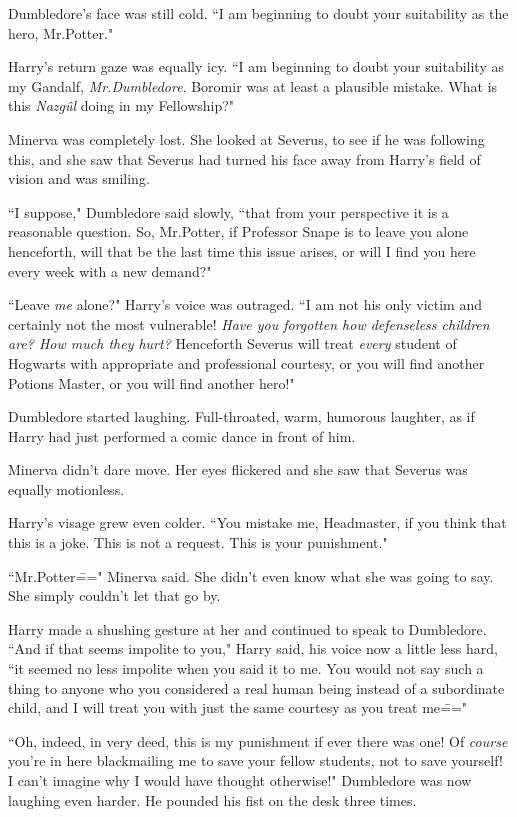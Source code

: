 Dumbledore's face was still cold. ``I am beginning to doubt your suitability as the hero, Mr.\?Potter."

Harry's return gaze was equally icy. ``I am beginning to doubt your suitability as my Gandalf, \emph{Mr.\?Dumbledore}. Boromir was at least a plausible mistake. What is this \emph{Nazgûl} doing in my Fellowship?"

Minerva was completely lost. She looked at Severus, to see if he was following this, and she saw that Severus had turned his face away from Harry's field of vision and was smiling.

``I suppose," Dumbledore said slowly, ``that from your perspective it is a reasonable question. So, Mr.\?Potter, if Professor Snape is to leave you alone henceforth, will that be the last time this issue arises, or will I find you here every week with a new demand?"

``Leave \emph{me} alone?" Harry's voice was outraged. ``I am not his only victim and certainly not the most vulnerable! \emph{Have you forgotten how defenseless children are? How much they hurt?} Henceforth Severus will treat \emph{every} student of Hogwarts with appropriate and professional courtesy, or you will find another Potions Master, or you will find another hero!"

Dumbledore started laughing. Full-throated, warm, humorous laughter, as if Harry had just performed a comic dance in front of him.

Minerva didn't dare move. Her eyes flickered and she saw that Severus was equally motionless.

Harry's visage grew even colder. ``You mistake me, Headmaster, if you think that this is a joke. This is not a request. This is your punishment."

``Mr.\?Potter\===" Minerva said. She didn't even know what she was going to say. She simply couldn't let that go by.

Harry made a shushing gesture at her and continued to speak to Dumbledore. ``And if that seems impolite to you," Harry said, his voice now a little less hard, ``it seemed no less impolite when you said it to me. You would not say such a thing to anyone who you considered a real human being instead of a subordinate child, and I will treat you with just the same courtesy as you treat me\==="

``Oh, indeed, in very deed, this is my punishment if ever there was one! Of \emph{course} you're in here blackmailing me to save your fellow students, not to save yourself! I can't imagine why I would have thought otherwise!" Dumbledore was now laughing even harder. He pounded his fist on the desk three times.

